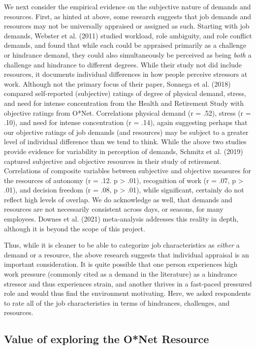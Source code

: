 \documentclass[
  english,
  man]{apa6}
\begin{document}
We next consider the empirical evidence on the subjective nature of demands and resources. First, as hinted at above, some research suggests that job demands and resources may not be universally appraised or assigned as such. Starting with job demands, Webster et al. (2011) studied workload, role ambiguity, and role conflict demands, and found that while each could be appraised primarily as a challenge or hindrance demand, they could also simultaneously be perceived as being \emph{both} a challenge and hindrance to different degrees. While their study not did include resources, it documents individual differences in how people perceive stressors at work. Although not the primary focus of their paper, Sonnega et al. (2018) compared self-reported (subjective) ratings of degree of physical demand, stress, and need for intense concentration from the Health and Retirement Study with objective ratings from O*Net. Correlations physical demand (r = .52), stress (r = .10), and need for intense concentration (r = .14), again suggesting perhaps that our objective ratings of job demands (and resources) may be subject to a greater level of individual difference than we tend to think. While the above two studies provide evidence for variability in perception of demands, Schmitz et al. (2019) captured subjective and objective resources in their study of retirement. Correlations of composite variables between subjective and objective measures for the resources of autonomy (r = .12. p \textgreater{} .01), recognition of work (r = .07, p \textgreater{} .01), and decision freedom (r = .08, p \textgreater{} .01), while significant, certainly do not reflect high levels of overlap. We do acknowledge as well, that demands and resources are not necessarily consistent across days, or seasons, for many employees. Downes et al. (2021) meta-analysis addresses this reality in depth, although it is beyond the scope of this project.

Thus, while it is cleaner to be able to categorize job characteristics as \emph{either} a demand or a resource, the above research suggests that individual appraisal is an important consideration. It is quite possible that one person experiences high work pressure (commonly cited as a demand in the literature) as a hindrance stressor and thus experiences strain, and another thrives in a fast-paced pressured role and would thus find the environment motivating. Here, we asked respondents to rate all of the job characteristics in terms of hindrances, challenges, and resources.

\hypertarget{value-of-exploring-the-onet-resource}{%
\subsection{Value of exploring the O*Net Resource}\label{value-of-exploring-the-onet-resource}}
\end{document}
